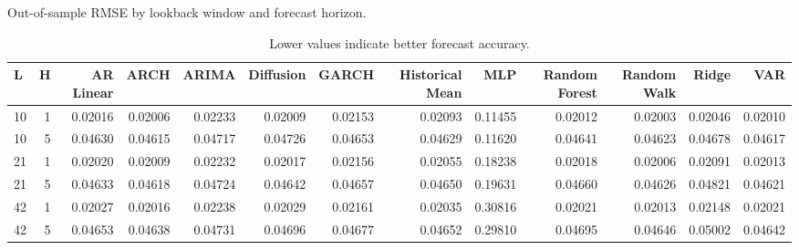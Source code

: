 \begin{table}[!htbp]
\centering
\caption{Out-of-sample RMSE by lookback window and forecast horizon.}
\label{tab:rmse-by-config}
\begin{tabular}{lrrrrrrrrrrrr}
\toprule
L & H & AR Linear & ARCH & ARIMA & Diffusion & GARCH & Historical Mean & MLP & Random Forest & Random Walk & Ridge & VAR \\
\midrule
10 & 1 & 0.02016 & 0.02006 & 0.02233 & 0.02009 & 0.02153 & 0.02093 & 0.11455 & 0.02012 & 0.02003 & 0.02046 & 0.02010 \\
10 & 5 & 0.04630 & 0.04615 & 0.04717 & 0.04726 & 0.04653 & 0.04629 & 0.11620 & 0.04641 & 0.04623 & 0.04678 & 0.04617 \\
21 & 1 & 0.02020 & 0.02009 & 0.02232 & 0.02017 & 0.02156 & 0.02055 & 0.18238 & 0.02018 & 0.02006 & 0.02091 & 0.02013 \\
21 & 5 & 0.04633 & 0.04618 & 0.04724 & 0.04642 & 0.04657 & 0.04650 & 0.19631 & 0.04660 & 0.04626 & 0.04821 & 0.04621 \\
42 & 1 & 0.02027 & 0.02016 & 0.02238 & 0.02029 & 0.02161 & 0.02035 & 0.30816 & 0.02021 & 0.02013 & 0.02148 & 0.02021 \\
42 & 5 & 0.04653 & 0.04638 & 0.04731 & 0.04696 & 0.04677 & 0.04652 & 0.29810 & 0.04695 & 0.04646 & 0.05002 & 0.04642 \\
\bottomrule
\end{tabular}
\caption*{\footnotesize Lower values indicate better forecast accuracy.}
\end{table}
